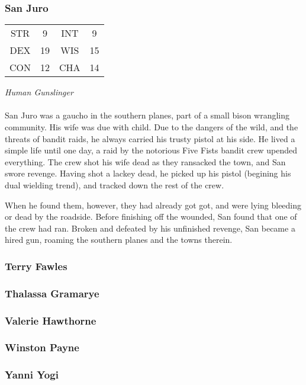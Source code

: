 \subsubsection{San Juro}
\label{people:david}
\begin{center}
\begin{tabular}{c c|c c}
STR & 9 & INT & 9 \\
DEX & 19 & WIS & 15 \\
CON & 12 & CHA & 14 \end{tabular}\end{center}
\textit{Human Gunslinger}\\
\\
San Juro was a gaucho in the southern planes, part of a small bison wrangling community. His wife was due with child. Due to the dangers of the wild, and the threats of bandit raids, he always carried his trusty pistol at his side. He lived a simple life until one day, a raid by the notorious Five Fists bandit crew upended everything. The crew shot his wife dead as they ransacked the town, and San swore revenge. Having shot a lackey dead, he picked up his pistol (begining his dual wielding trend), and tracked down the rest of the crew.

When he found them, however, they had already got got, and were lying bleeding or dead by the roadside. Before finishing off the wounded, San found that one of the crew had ran. Broken and defeated by his unfinished revenge, San became a hired gun, roaming the southern planes and the towns therein.


\subsubsection{Terry Fawles}
\label{people:fawles}

\subsubsection{Thalassa Gramarye}
\label{people:thalassa}

\subsubsection{Valerie Hawthorne}
\label{people:valerie}

\subsubsection{Winston Payne}
\label{people:wpayne}


\subsubsection{Yanni Yogi}
\label{people:yogi}
